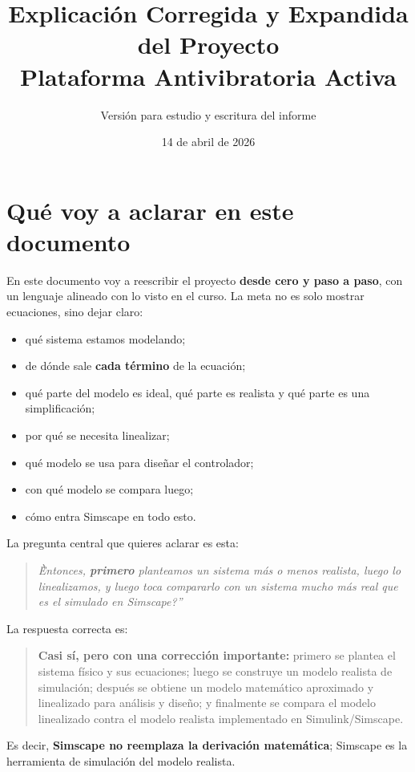 \documentclass[11pt]{article}
\title{Explicaci\'on Corregida y Expandida del Proyecto\\Plataforma Antivibratoria Activa}
\author{Versi\'on para estudio y escritura del informe}
\date{14 de abril de 2026}
\begin{document}
\maketitle
\tableofcontents
\newpage

\section{Qu\'e voy a aclarar en este documento}

En este documento voy a reescribir el proyecto \textbf{desde cero y paso a paso}, con un lenguaje alineado con lo visto en el curso. La meta no es solo mostrar ecuaciones, sino dejar claro:

\begin{itemize}[leftmargin=1.2cm]
\item qu\'e sistema estamos modelando;
\item de d\'onde sale \textbf{cada t\'ermino} de la ecuaci\'on;
\item qu\'e parte del modelo es ideal, qu\'e parte es realista y qu\'e parte es una simplificaci\'on;
\item por qu\'e se necesita linealizar;
\item qu\'e modelo se usa para dise\~nar el controlador;
\item con qu\'e modelo se compara luego;
\item c\'omo entra Simscape en todo esto.
\end{itemize}

La pregunta central que quieres aclarar es esta:

\begin{quote}
\textit{\`\`Entonces, \textbf{primero} planteamos un sistema m\'as o menos realista, luego lo linealizamos, y luego toca compararlo con un sistema mucho m\'as real que es el simulado en Simscape?''}
\end{quote}

La respuesta correcta es:

\begin{quote}
\textbf{Casi s\'i, pero con una correcci\'on importante:} primero se plantea el sistema f\'isico y sus ecuaciones; luego se construye un modelo realista de simulaci\'on; despu\'es se obtiene un modelo matem\'atico aproximado y linealizado para an\'alisis y dise\~no; y finalmente se compara el modelo linealizado contra el modelo realista implementado en Simulink/Simscape.
\end{quote}

Es decir, \textbf{Simscape no reemplaza la derivaci\'on matem\'atica}; Simscape es la herramienta de simulaci\'on del modelo realista.
\end{document}

